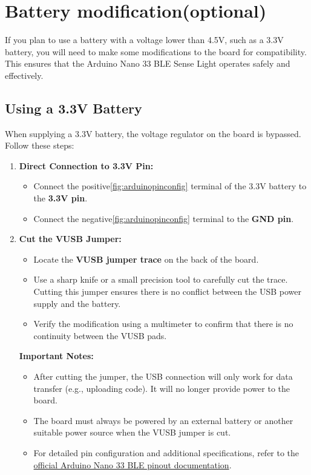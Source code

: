 \section{Battery modification(optional)}

If you plan to use a battery with a voltage lower than 4.5V, such as a 3.3V battery, you will need to make some modifications to the board for compatibility. This ensures that the Arduino Nano 33 BLE Sense Light operates safely and effectively.

\subsection{ Using a 3.3V Battery}
When supplying a 3.3V battery, the voltage regulator on the board is bypassed. Follow these steps:

\begin{enumerate}
    \item \textbf{Direct Connection to 3.3V Pin:}
    \begin{itemize}
        \item Connect the positive\ref{fig:arduinopinconfig} terminal of the 3.3V battery to the \textbf{3.3V pin}.
        \item Connect the negative\ref{fig:arduinopinconfig} terminal to the \textbf{GND pin}.
    \end{itemize}
    
    \item \textbf{Cut the VUSB Jumper:}
    \begin{itemize}
        \item Locate the \textbf{VUSB jumper trace} on the back of the board.
        \item Use a sharp knife or a small precision tool to carefully cut the trace. Cutting this jumper ensures there is no conflict between the USB power supply and the battery.
        \item Verify the modification using a multimeter to confirm that there is no continuity between the VUSB pads.
    \end{itemize}
    \textbf{Important Notes:}
    \begin{itemize}
        \item After cutting the jumper, the USB connection will only work for data transfer (e.g., uploading code). It will no longer provide power to the board.
        \item The board must always be powered by an external battery or another suitable power source when the VUSB jumper is cut.
       \item For detailed pin configuration and additional specifications, refer to the \href{https://docs.arduino.cc/resources/pinouts/ABX00031-full-pinout.pdf}{official Arduino Nano 33 BLE pinout documentation}.
    \end{itemize}
    
 
\end{enumerate}



